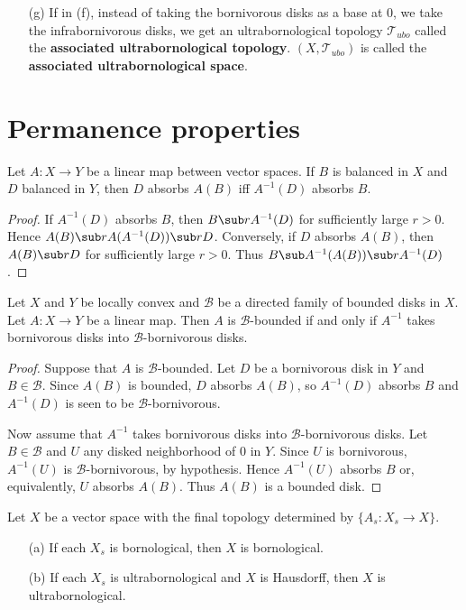 \begin{example}
\begin{itemize}
\item[(g)] If in (f), instead of taking the bornivorous disks as a base at $0$, we take the infrabornivorous disks, we get an ultrabornological topology $\mathcal{T}_{ubo}$ called the \textbf{associated ultrabornological topology}. $(X,\mathcal{T}_{ubo})$ is called the \textbf{associated ultrabornological space}.
\end{itemize}
\end{example}
\section{Permanence properties}
\begin{lemma}\label{TVS balanced sets absorb linear image iff}
Let $A:X\to Y$ be a linear map between vector spaces. If $B$ is balanced in $X$ and $D$ balanced in $Y$, then $D$ absorbs $A(B)$ iff $A^{-1}(D)$ absorbs $B$.
\end{lemma}
\begin{proof}
If $A^{-1}(D)$ absorbs $B$, then $B\sub rA^{-1}(D)$ for sufficiently large $r>0$. Hence $A(B)\sub rA(A^{-1}(D))\sub rD$. Conversely, if $D$ absorbs $A(B)$, then $A(B)\sub rD$ for sufficiently large $r>0$. Thus $B\sub A^{-1}(A(B))\sub rA^{-1}(D)$.
\end{proof}
\begin{proposition}\label{LCS map B-bounded iff A^-1}
Let $X$ and $Y$ be locally convex and $\mathcal{B}$ be a directed family of bounded disks in $X$. Let $A:X\to Y$ be a linear map. Then $A$ is $\mathcal{B}$-bounded if and only if $A^{-1}$ takes bornivorous disks into $\mathcal{B}$-bornivorous disks.
\end{proposition}
\begin{proof}
Suppose that $A$ is $\mathcal{B}$-bounded. Let $D$ be a bornivorous disk in $Y$ and $B\in\mathcal{B}$. Since $A(B)$ is bounded, $D$ absorbs $A(B)$, so $A^{-1}(D)$ absorbs $B$ and $A^{-1}(D)$ is seen to be $\mathcal{B}$-bornivorous.\par
Now assume that $A^{-1}$ takes bornivorous disks into $\mathcal{B}$-bornivorous disks. Let $B\in\mathcal{B}$ and $U$ any disked neighborhood of $0$ in $Y$. Since $U$ is bornivorous, $A^{-1}(U)$ is $\mathcal{B}$-bornivorous, by hypothesis. Hence $A^{-1}(U)$ absorbs $B$ or, equivalently, $U$ absorbs $A(B)$. Thus $A(B)$ is a bounded disk.
\end{proof}
\begin{proposition}\label{LCS bornological final topo}
Let $X$ be a vector space with the final topology determined by $\{A_s:X_s\to X\}$.
\begin{itemize}
\item[(a)] If each $X_s$ is bornological, then $X$ is bornological.
\item[(b)] If each $X_s$ is ultrabornological and $X$ is Hausdorff, then $X$ is ultrabornological.
\end{itemize}
\end{proposition}
